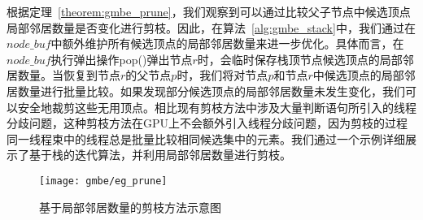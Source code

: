 根据定理~\ref{theorem:gmbe_prune}，我们观察到可以通过比较父子节点中候选顶点局部邻居数量是否变化进行剪枝。因此，在算法~\ref{alg:gmbe_stack}中，我们通过在$node\_buf$中额外维护所有候选顶点的局部邻居数量来进一步优化。具体而言，在$node\_buf$执行弹出操作\textsf{pop()}弹出节点$r$时，会临时保存栈顶节点候选顶点的局部邻居数量。当恢复到节点$r$的父节点$p$时，我们将对节点$p$和节点$r$中候选顶点的局部邻居数量进行批量比较。如果发现部分候选顶点的局部邻居数量未发生变化，我们可以安全地裁剪这些无用顶点。相比现有剪枝方法中涉及大量判断语句所引入的线程分歧问题，这种剪枝方法在GPU上不会额外引入线程分歧问题，因为剪枝的过程同一线程束中的线程总是批量比较相同候选集中的元素。我们通过一个示例详细展示了基于栈的迭代算法，并利用局部邻居数量进行剪枝。












\begin{figure} [H]
  \center
    \vspace{0.1in}
		\texttt{[image: gmbe/eg\_prune]}
    \vspace{0.1in}
	\caption{基于局部邻居数量的剪枝方法示意图}
	\label{fig:gmbe_prune}
\end{figure}

